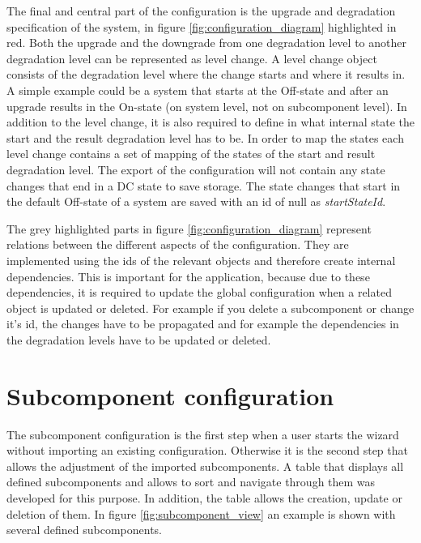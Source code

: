 The final and central part of the configuration is the upgrade and degradation specification of the system, in figure \ref{fig:configuration_diagram} highlighted in red. Both the upgrade and the downgrade from one degradation level to another degradation level can be represented as level change. A level change object consists of the degradation level where the change starts and where it results in. A simple example could be a system that starts at the Off-state and after an upgrade results in the On-state (on system level, not on subcomponent level). In addition to the level change, it is also required to define in what internal state the start and the result degradation level has to be. In order to map the states each level change contains a set of mapping of the states of the start and result degradation level. The export of the configuration will not contain any state changes that end in a DC state to save storage. The state changes that start in the default Off-state of a system are saved with an id of null as \textit{startStateId}.

The grey highlighted parts in figure \ref{fig:configuration_diagram} represent relations between the different aspects of the configuration. They are implemented using the ids of the relevant objects and therefore create internal dependencies. This is important for the application, because due to these dependencies, it is required to update the global configuration when a related object is updated or deleted. For example if you delete a subcomponent or change it's id, the changes have to be propagated and for example the dependencies in the degradation levels have to be updated or deleted.

\section{Subcomponent configuration}

The subcomponent configuration is the first step when a user starts the wizard without importing an existing configuration. Otherwise it is the second step that allows the adjustment of the imported subcomponents.
A table that displays all defined subcomponents and allows to sort and navigate through them was developed for this purpose. In addition, the table allows the creation, update or deletion of them. In figure \ref{fig:subcomponent_view} an example is shown with several defined subcomponents.

